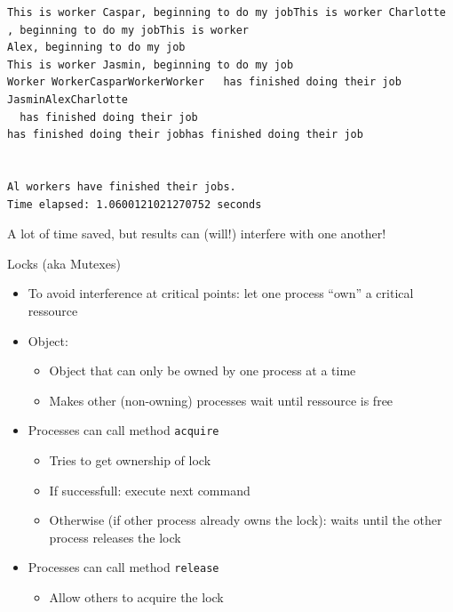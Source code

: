 
\begin{frame}[fragile]
%
\begin{cmdbox}
\begin{verbatim}
This is worker Caspar, beginning to do my jobThis is worker Charlotte
, beginning to do my jobThis is worker 
Alex, beginning to do my job
This is worker Jasmin, beginning to do my job
Worker WorkerCasparWorkerWorker   has finished doing their job JasminAlexCharlotte
  has finished doing their job 
has finished doing their jobhas finished doing their job


Al workers have finished their jobs.
Time elapsed: 1.0600121021270752 seconds
\end{verbatim}
\end{cmdbox}

\begin{center}
\Thus A lot of time saved, but results can (will!) interfere with one another!
\end{center}
%
\end{frame}


\begin{frame}{Locks (aka Mutexes)}
%
\begin{itemize}
\item To avoid interference at critical points: let one process \enquote{own} a critical ressource
\item Object: 
	\begin{itemize}
	\item Object that can only be owned by one process at a time
	\item Makes other (non-owning) processes wait until ressource is free
	\end{itemize}
\item Processes can call method \texttt{acquire}
	\begin{itemize}
	\item Tries to get ownership of lock
	\item If successfull: execute next command
	\item Otherwise (if other process already owns the lock): waits until the other process releases the lock
	\end{itemize}
\item Processes can call method \texttt{release}
	\begin{itemize}
	\item Allow others to acquire the lock
	\end{itemize}
\end{itemize}
%
\end{frame}

